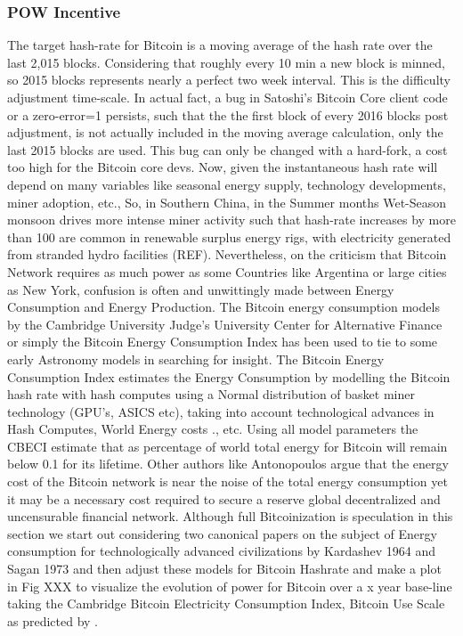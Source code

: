 \documentclass[final,5p,times,twocolumn,authoryear]{elsarticle}
\begin{document}
\subsubsection{POW Incentive}
The target hash-rate for Bitcoin is a moving average of the hash rate over the last 2,015 blocks. Considering that roughly every 10 min a new block is minned, so 2015 blocks represents nearly a perfect two week interval. This is the difficulty adjustment time-scale. In actual fact, a bug in Satoshi's Bitcoin Core client code or a zero-error=1 persists, such that the the first block of every 2016 blocks post adjustment, is not actually included in the moving average calculation, only the last 2015 blocks are used. This bug can only be changed with a hard-fork, a cost too high for the Bitcoin core devs. Now, given the instantaneous hash rate will depend on many variables like seasonal energy supply, technology developments, miner adoption, etc., So, in Southern China, in the Summer months Wet-Season monsoon drives more intense miner activity such that hash-rate increases by more than 100 \percent are common in  renewable surplus energy rigs, with electricity generated from stranded hydro facilities (REF). Nevertheless, on the criticism that Bitcoin Network requires as much power as some Countries like Argentina or large cities as New York, confusion is often and unwittingly made between Energy Consumption and Energy Production. The Bitcoin energy consumption models by the Cambridge University Judge's University Center for Alternative Finance or simply the Bitcoin Energy Consumption Index has been used to tie to some early Astronomy models in searching for insight. The Bitcoin Energy Consumption Index estimates the Energy Consumption by modelling the Bitcoin hash rate with hash computes using a Normal distribution of basket miner technology (GPU's, ASICS etc), taking into account technological advances in Hash Computes, World Energy costs ., etc. Using all model parameters the CBECI estimate that as percentage of world total energy for Bitcoin will remain below 0.1 \percent for its lifetime. Other authors like Antonopoulos argue that the energy cost of the Bitcoin network is near the noise of the total energy consumption yet it may be a necessary cost required to secure a reserve global decentralized and uncensurable financial network. Although full Bitcoinization is speculation in this section we start out considering two canonical papers on the subject of Energy consumption for technologically advanced civilizations by Kardashev 1964 and Sagan 1973 and then adjust these models for Bitcoin Hashrate and make a plot in Fig XXX to visualize the evolution of power for Bitcoin over a x year base-line taking the Cambridge Bitcoin Electricity Consumption Index, Bitcoin Use Scale as predicted by . 
\end{document}
